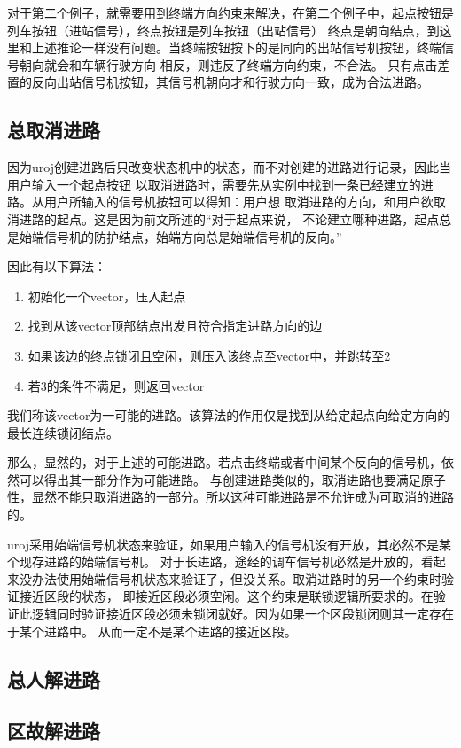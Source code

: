 对于第二个例子，就需要用到终端方向约束来解决，在第二个例子中，起点按钮是列车按钮（进站信号），终点按钮是列车按钮（出站信号）
终点是朝向结点，到这里和上述推论一样没有问题。当终端按钮按下的是同向的出站信号机按钮，终端信号朝向就会和车辆行驶方向
相反，则违反了终端方向约束，不合法。
只有点击差置的反向出站信号机按钮，其信号机朝向才和行驶方向一致，成为合法进路。

\subsection{总取消进路}
因为uroj创建进路后只改变状态机中的状态，而不对创建的进路进行记录，因此当用户输入一个起点按钮
以取消进路时，需要先从实例中找到一条已经建立的进路。从用户所输入的信号机按钮可以得知：用户想
取消进路的方向，和用户欲取消进路的起点。这是因为前文所述的“对于起点来说，
不论建立哪种进路，起点总是始端信号机的防护结点，始端方向总是始端信号机的反向。”

因此有以下算法：
\begin{enumerate}
    \item 初始化一个vector，压入起点
    \item 找到从该vector顶部结点出发且符合指定进路方向的边
    \item 如果该边的终点锁闭且空闲，则压入该终点至vector中，并跳转至2
    \item 若3的条件不满足，则返回vector
\end{enumerate}
我们称该vector为一可能的进路。该算法的作用仅是找到从给定起点向给定方向的最长连续锁闭结点。

那么，显然的，对于上述的可能进路。若点击终端或者中间某个反向的信号机，依然可以得出其一部分作为可能进路。
与创建进路类似的，取消进路也要满足原子性，显然不能只取消进路的一部分。所以这种可能进路是不允许成为可取消的进路的。

uroj采用始端信号机状态来验证，如果用户输入的信号机没有开放，其必然不是某个现存进路的始端信号机。
对于长进路，途经的调车信号机必然是开放的，看起来没办法使用始端信号机状态来验证了，但没关系。取消进路时的另一个约束时验证接近区段的状态，
即接近区段必须空闲。这个约束是联锁逻辑所要求的。在验证此逻辑同时验证接近区段必须未锁闭就好。因为如果一个区段锁闭则其一定存在于某个进路中。
从而一定不是某个进路的接近区段。

\subsection{总人解进路}
\subsection{区故解进路}
